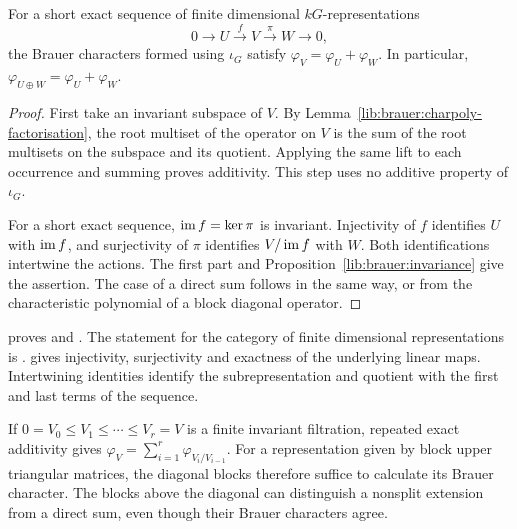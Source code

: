 \begin{theorem}
\label{lib:brauer:short-exact}
For a short exact sequence of finite dimensional $kG$-representations
\[
 0\longrightarrow U\overset{f}{\longrightarrow}V
   \overset{\pi}{\longrightarrow}W\longrightarrow0,
\]
the Brauer characters formed using $\iota_G$ satisfy
$\varphi_V=\varphi_U+\varphi_W$. In particular,
$\varphi_{U\oplus W}=\varphi_U+\varphi_W$.
\end{theorem}
\begin{proof}
First take an invariant subspace of $V$. By
Lemma~\ref{lib:brauer:charpoly-factorisation}, the root multiset of the
operator on $V$ is the sum of the root multisets on the subspace and its
quotient. Applying the same lift to each occurrence and summing proves
additivity. This step uses no additive property of $\iota_G$.

For a short exact sequence, $\operatorname{im} f=\ker \pi$ is invariant. Injectivity of
$f$ identifies $U$ with $\operatorname{im} f$, and surjectivity of $\pi$ identifies
$V/\operatorname{im} f$ with $W$. Both identifications intertwine the actions. The
first part and Proposition~\ref{lib:brauer:invariance} give the assertion.
The case of a direct sum follows in the same way, or from the characteristic
polynomial of a block diagonal operator.
\end{proof}

\begin{implementation}
 proves
and .
The statement for the category of finite dimensional representations is
.
 gives injectivity,
surjectivity and exactness of the underlying linear maps. Intertwining
identities identify the subrepresentation and quotient with the first
and last terms of the sequence.
\end{implementation}

\begin{example}
If $0=V_0\leq V_1\leq\cdots\leq V_r=V$ is a finite invariant filtration,
repeated exact additivity gives
$\varphi_V=\sum_{i=1}^r\varphi_{V_i/V_{i-1}}$.
For a representation given by block upper triangular matrices, the
diagonal blocks therefore suffice to calculate its Brauer character.
The blocks above the diagonal can distinguish a nonsplit extension from
a direct sum, even though their Brauer characters agree.
\end{example}

